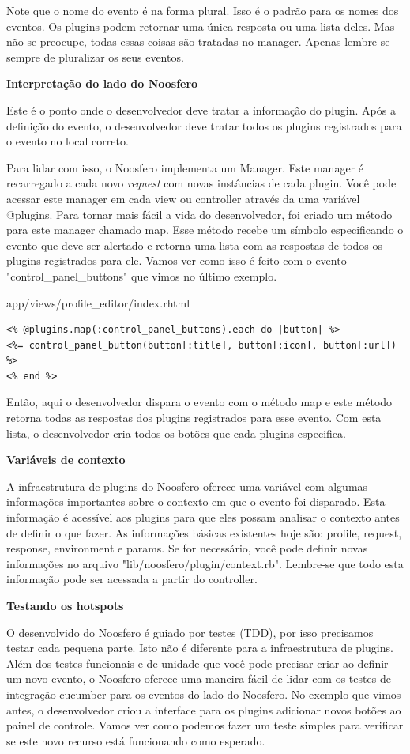 \documentclass[11pt]{article}
\begin{document}
Note que o nome do evento é na forma plural. Isso é o padrão para os nomes dos
eventos. Os plugins podem retornar uma única resposta ou uma lista deles. Mas
não se preocupe, todas essas coisas são tratadas no manager. Apenas lembre-se
sempre de pluralizar os seus eventos.

{\bf Interpretação do lado do Noosfero}

Este é o ponto onde o desenvolvedor deve tratar a informação do plugin. Após a
definição do evento, o desenvolvedor deve tratar todos os plugins registrados
para o evento no local correto.

Para lidar com isso, o Noosfero implementa um Manager. Este manager é
recarregado a cada novo {\it request} com novas instâncias de cada plugin. Você pode
acessar este manager em cada view ou controller através da uma variável
@plugins. Para tornar mais fácil a vida do desenvolvedor, foi criado um método
para este manager chamado map. Esse método recebe um símbolo especificando o
evento que deve ser alertado e retorna uma lista com as respostas de todos os
plugins registrados para ele. Vamos ver como isso é feito com o evento
"control\_panel\_buttons" que vimos no último exemplo.

app/views/profile\_editor/index.rhtml
\begin{Verbatim}[frame=single,fontfamily=courier]
<% @plugins.map(:control_panel_buttons).each do |button| %>
<%= control_panel_button(button[:title], button[:icon], button[:url]) %>
<% end %>
\end{Verbatim}

Então, aqui o desenvolvedor dispara o evento com o método map e este método 
retorna todas as respostas dos plugins registrados para esse evento. Com esta 
lista, o desenvolvedor cria todos os botões que cada plugins especifica.

{\bf Variáveis de contexto}

A infraestrutura de plugins do Noosfero oferece uma variável com algumas
informações importantes sobre o contexto em que o evento foi disparado. Esta
informação é acessível aos plugins para que eles possam analisar o contexto
antes de definir o que fazer. As informações básicas existentes hoje são:
profile, request, response, environment e params. Se for necessário, você pode
definir novas informações no arquivo "lib/noosfero/plugin/context.rb".
Lembre-se que todo esta informação pode ser acessada a partir do controller.

{\bf Testando os hotspots}

O desenvolvido do Noosfero é guiado por testes (TDD), por isso precisamos
testar cada pequena parte. Isto não é diferente para a infraestrutura de
plugins. Além dos testes funcionais e de unidade que você pode precisar criar
ao definir um novo evento, o Noosfero oferece uma maneira fácil de lidar com
os testes de integração cucumber para os eventos do lado do Noosfero. No
exemplo que vimos antes, o desenvolvedor criou a interface para os plugins
adicionar novos botões ao painel de controle. Vamos ver como podemos fazer um
teste simples para verificar se este novo recurso está funcionando como
esperado.
\end{document}
